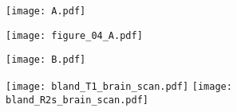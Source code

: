 \documentclass[preview]{standalone}
\begin{document}
\begin{figure}
	\centering
	\begin{minipage}{.03\textwidth}
		\texttt{[image: A.pdf]}\vspace*{4.3cm}
	\end{minipage}
	\hfill %
	\begin{minipage}{.96\textwidth}
		\texttt{[image: figure\_04\_A.pdf]}
	\end{minipage}%

	\vspace*{0.2cm}

	\begin{minipage}{.03\textwidth}
		\texttt{[image: B.pdf]}\vspace*{2.7cm}
	\end{minipage}
	\hfill %
	\begin{minipage}{.96\textwidth}
		\hspace{1.5cm}
		\texttt{[image: bland\_T1\_brain\_scan.pdf]}\hspace{0.8cm}
		\texttt{[image: bland\_R2s\_brain\_scan.pdf]}\hfill
	\end{minipage}%

\end{figure}
\end{document}
